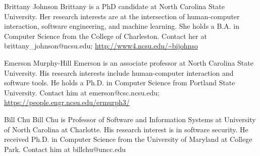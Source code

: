 \documentclass[10pt,journal,compsoc]{IEEEtran}
\begin{document}
\begin{IEEEbiography}{Brittany Johnson}
	Brittany is a PhD candidate at North Carolina State University. Her research interests are at the intersection of human-computer interaction, software engineering, and machine learning. She holds a B.A. in Computer Science from the College of Charleston. 
	Contact her at brittany\_johnson@ncsu.edu; 
	\url{http://www4.ncsu.edu/~bijohnso}
\end{IEEEbiography}

\begin{IEEEbiography}{Emerson Murphy-Hill}
	Emerson is an associate professor at North Carolina State University. His research interests include human-computer interaction and software tools. He holds a Ph.D. in Computer Science from Portland State University. 
	Contact him at emerson@csc.ncsu.edu; \url{https://people.engr.ncsu.edu/ermurph3/}
	
\end{IEEEbiography}

\begin{IEEEbiography}{Bill Chu}
	Bill Chu is  Professor of Software and Information Systems at University of North Carolina at Charlotte. His research interest is in software security. He received  Ph.D. in Computer Science from the University of Maryland at College Park. 
	Contact him at billchu@uncc.edu
\end{IEEEbiography}
\end{document}
